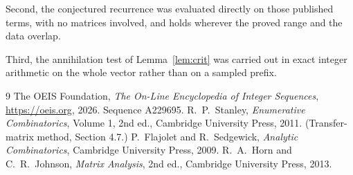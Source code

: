 \documentclass[11pt,a4paper]{article}
\theoremstyle{plain}
\theoremstyle{definition}
\begin{document}
Second, the conjectured recurrence was evaluated directly on those published terms, with no
matrices involved, and holds wherever the proved range and the data overlap.

Third, the annihilation test of Lemma~\ref{lem:crit} was carried out in exact integer
arithmetic on the whole vector rather than on a sampled prefix.

\begin{thebibliography}{9}
 The OEIS Foundation, \emph{The On-Line Encyclopedia of Integer
Sequences}, \url{https://oeis.org}, 2026. Sequence A229695.
 R.~P.~Stanley, \emph{Enumerative Combinatorics}, Volume 1, 2nd ed.,
Cambridge University Press, 2011. (Transfer-matrix method, Section 4.7.)
 P.~Flajolet and R.~Sedgewick, \emph{Analytic Combinatorics}, Cambridge
University Press, 2009.
 R.~A.~Horn and C.~R.~Johnson, \emph{Matrix Analysis}, 2nd ed., Cambridge
University Press, 2013.
\end{thebibliography}
\end{document}
